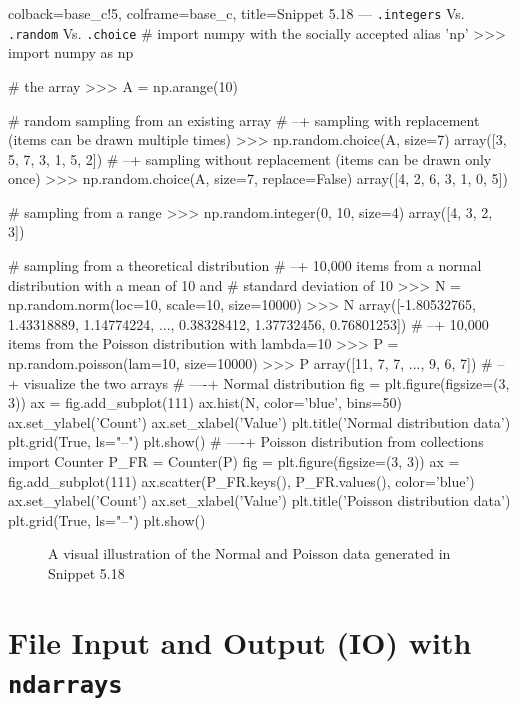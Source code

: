 \documentclass[a4paper,11pt]{book}
\begin{document}
\begin{pythoncode}[linenos=true,]{colback=base_c!5, colframe=base_c, title=\sffamily Snippet 5.18 --- \texttt{.integers} Vs. \texttt{.random} Vs. \texttt{.choice}}
# import numpy with the socially accepted alias 'np'
>>> import numpy as np

# the array
>>> A = np.arange(10)

# random sampling from an existing array
# --+ sampling with replacement (items can be drawn multiple times)
>>> np.random.choice(A, size=7)
array([3, 5, 7, 3, 1, 5, 2])
# --+ sampling without replacement (items can be drawn only once)
>>> np.random.choice(A, size=7, replace=False)
array([4, 2, 6, 3, 1, 0, 5])

# sampling from a range
>>> np.random.integer(0, 10, size=4)
array([4, 3, 2, 3])

# sampling from a theoretical distribution
# --+ 10,000 items from a normal distribution with a mean of 10 and 
# standard deviation of 10
>>> N = np.random.norm(loc=10, scale=10, size=10000)
>>> N
array([-1.80532765,  1.43318889,  1.14774224, ...,  0.38328412,
        1.37732456,  0.76801253])
# --+ 10,000 items from the Poisson distribution with lambda=10
>>> P = np.random.poisson(lam=10, size=10000)
>>> P
array([11,  7,  7, ...,  9,  6,  7])
# --+ visualize the two arrays
# ----+ Normal distribution
fig = plt.figure(figsize=(3, 3))
ax = fig.add_subplot(111)
ax.hist(N, color='blue', bins=50)
ax.set_ylabel('Count')
ax.set_xlabel('Value')
plt.title('Normal distribution data')
plt.grid(True,  ls="--")
plt.show()
# ----+ Poisson distribution
from collections import Counter
P_FR = Counter(P)
fig = plt.figure(figsize=(3, 3))
ax = fig.add_subplot(111)
ax.scatter(P_FR.keys(), P_FR.values(), color='blue')
ax.set_ylabel('Count')
ax.set_xlabel('Value')
plt.title('Poisson distribution data')
plt.grid(True, ls="--")
plt.show()
\end{pythoncode}

\begin{figure}[!htbp]
	\centering
	
	
	\caption{A visual illustration of the Normal and Poisson data generated in Snippet 5.18}
	\label{fig:normal_and_poisson_distros}
\end{figure}


\section{File Input and Output (IO) with \texttt{ndarrays}}
\end{document}

